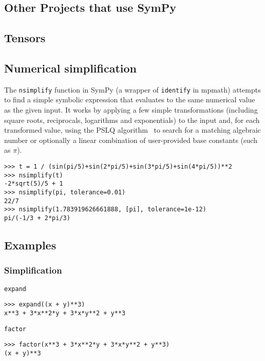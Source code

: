 \subsection{Other Projects that use SymPy}




\subsection{Tensors}




\subsection{Numerical simplification}

The \texttt{nsimplify} function in SymPy
(a wrapper of \texttt{identify} in mpmath)
attempts to find a simple symbolic
expression that evaluates to the same numerical value as the given
input.
It works by applying a few simple transformations
(including square roots, reciprocals, logarithms and exponentials) to
the input and, for each transformed value,
using the PSLQ algorithm~\cite{Ferguson1999} to search for
a matching algebraic number or optionally a linear combination
of user-provided base constants (such as $\pi$).

\begin{verbatim}
>>> t = 1 / (sin(pi/5)+sin(2*pi/5)+sin(3*pi/5)+sin(4*pi/5))**2
>>> nsimplify(t)
-2*sqrt(5)/5 + 1
>>> nsimplify(pi, tolerance=0.01)
22/7
>>> nsimplify(1.783919626661888, [pi], tolerance=1e-12)
pi/(-1/3 + 2*pi/3)
\end{verbatim}


\subsection{Examples}

\subsubsection{Simplification}

\noindent \texttt{expand}
\begin{verbatim}
>>> expand((x + y)**3)
x**3 + 3*x**2*y + 3*x*y**2 + y**3
\end{verbatim}

\noindent \texttt{factor}
\begin{verbatim}
>>> factor(x**3 + 3*x**2*y + 3*x*y**2 + y**3)
(x + y)**3
\end{verbatim}

